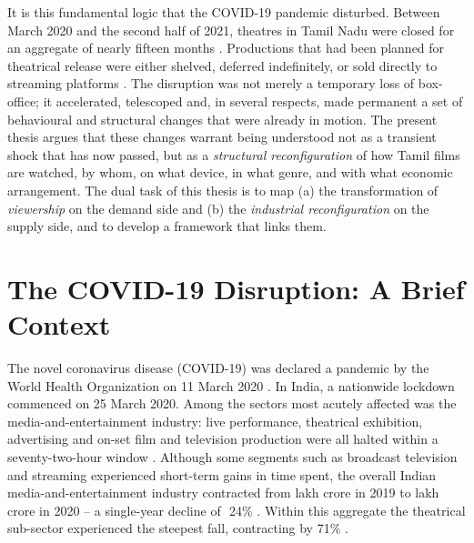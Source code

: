 It is this fundamental logic that the COVID-19 pandemic disturbed.
Between March 2020 and the second half of 2021, theatres in Tamil
Nadu were closed for an aggregate of nearly fifteen months
\citep{thehindu2021lockdown,economictimes2021reopening}.  Productions
that had been planned for theatrical release were either shelved,
deferred indefinitely, or sold directly to streaming platforms
\citep{filmcompanion2021directott,variety2021directott}.  The
disruption was not merely a temporary loss of box-office; it
accelerated, telescoped and, in several respects, made permanent a
set of behavioural and structural changes that were already in
motion.  The present thesis argues that these changes warrant being
understood not as a transient shock that has now passed, but as a
\emph{structural reconfiguration} of how Tamil films are watched, by
whom, on what device, in what genre, and with what economic
arrangement.  The dual task of this thesis is to map (a) the
transformation of \emph{viewership} on the demand side and (b) the
\emph{industrial reconfiguration} on the supply side, and to develop
a framework that links them.

\section{The COVID-19 Disruption: A Brief Context}
\label{sec:context}

The novel coronavirus disease (COVID-19) was declared a pandemic by
the World Health Organization on 11 March 2020 \citep{who2020}.  In
India, a nationwide lockdown commenced on 25 March 2020.  Among the
sectors most acutely affected was the media-and-entertainment
industry: live performance, theatrical exhibition, advertising and
on-set film and television production were all halted within a
seventy-two-hour window \citep{ficciey2020,kpmg2021}.  Although
some segments such as broadcast television and streaming experienced
short-term gains in time spent, the overall Indian
media-and-entertainment industry contracted from  lakh
crore in 2019 to  lakh crore in 2020 -- a single-year
decline of \,\,24\% \citep{ficciey2021}.  Within this aggregate
the theatrical sub-sector experienced the steepest fall, contracting
by 71\% \citep{ficciey2021}.

